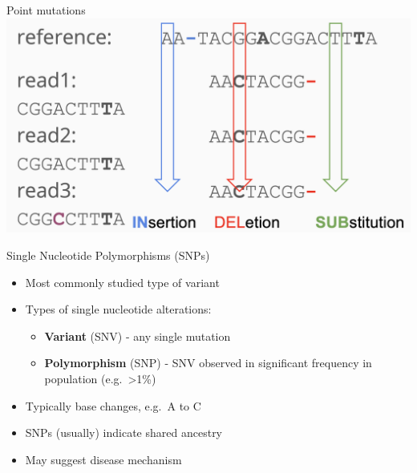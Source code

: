 \documentclass[
  ignorenonframetext,
]{beamer}
\providecommand{\tightlist}{%
  \setlength{\itemsep}{0pt}\setlength{\parskip}{0pt}}
\begin{document}
\begin{frame}{Point mutations}
\label{point-mutations}
\includegraphics{figs/point_mut.png}
\end{frame}

\begin{frame}{Single Nucleotide Polymorphisms (SNPs)}
\label{single-nucleotide-polymorphisms-snps}
\Large

\begin{itemize}
\tightlist
\item
  Most commonly studied type of variant
\item
  Types of single nucleotide alterations:

  \begin{itemize}
  \tightlist
  \item
    \textbf{Variant} (SNV) - any single mutation
  \item
    \textbf{Polymorphism} (SNP) - SNV observed in significant frequency
    in population (e.g.~\textgreater1\%)
  \end{itemize}
\item
  Typically base changes, e.g.~A to C
\item
  SNPs (usually) indicate shared ancestry
\item
  May suggest disease mechanism
\end{itemize}
\end{frame}
\end{document}
